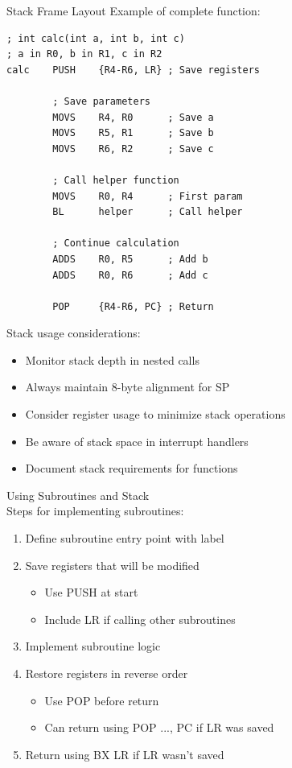 \begin{example2}{Stack Frame Layout}
Example of complete function:
\begin{lstlisting}[language=armasm, style=basesmol]
; int calc(int a, int b, int c)
; a in R0, b in R1, c in R2
calc    PUSH    {R4-R6, LR} ; Save registers
        
        ; Save parameters
        MOVS    R4, R0      ; Save a
        MOVS    R5, R1      ; Save b
        MOVS    R6, R2      ; Save c
        
        ; Call helper function
        MOVS    R0, R4      ; First param
        BL      helper      ; Call helper
        
        ; Continue calculation
        ADDS    R0, R5      ; Add b
        ADDS    R0, R6      ; Add c
        
        POP     {R4-R6, PC} ; Return
\end{lstlisting}
\end{example2}

\begin{remark}
Stack usage considerations:
\begin{itemize}
  \item Monitor stack depth in nested calls
  \item Always maintain 8-byte alignment for SP
  \item Consider register usage to minimize stack operations
  \item Be aware of stack space in interrupt handlers
  \item Document stack requirements for functions
\end{itemize}
\end{remark}

\begin{KR}{Using Subroutines and Stack}\\
Steps for implementing subroutines:
\begin{enumerate}
  \item Define subroutine entry point with label
  \item Save registers that will be modified
    \begin{itemize}
      \item Use PUSH at start
      \item Include LR if calling other subroutines
    \end{itemize}
  \item Implement subroutine logic
  \item Restore registers in reverse order
    \begin{itemize}
      \item Use POP before return
      \item Can return using POP {..., PC} if LR was saved
    \end{itemize}
  \item Return using BX LR if LR wasn't saved
\end{enumerate}
\end{KR}

